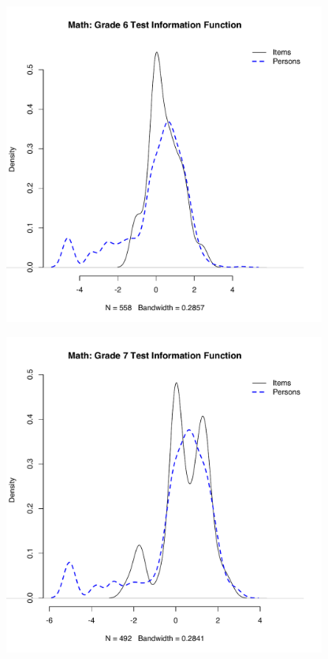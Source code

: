 \documentclass[]{article}
\begin{document}
\begin{figure}
\centering
\includegraphics[height=4.16667in]{ipdens/math6ipdens.pdf}
\caption{}
\end{figure}

\begin{figure}
\centering
\includegraphics[height=4.16667in]{ipdens/math7ipdens.pdf}
\caption{}
\end{figure}
\end{document}
